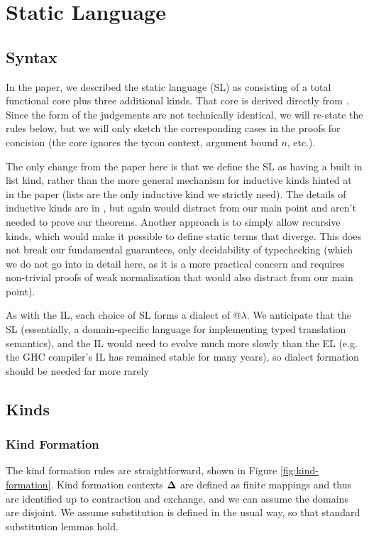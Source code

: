 \documentclass[12pt]{article}
\begin{document}
\section{Static Language}
\subsection{Syntax}

In the paper, we described the static language (SL) as consisting of a total functional core plus three additional kinds. That core is derived directly from \cite{pfpl}. Since the form of the judgements are not technically identical, we will re-state the rules below, but we will only sketch the corresponding cases in the proofs for concision (the core ignores the tycon context, argument bound $n$, etc.). 

The only change from the paper here is that we define the SL as having a built in list kind, rather than the more general mechanism for inductive kinds hinted at in the paper (lists are the only inductive kind we strictly need). The details of inductive kinds are in \cite{pfpl}, but again would distract from our main point and aren't needed to prove our theorems. Another approach is to simply allow recursive kinds, which would make it possible to define static terms that diverge. This does not break our fundamental guarantees, only decidability of typechecking (which we do not go into in detail here, as it is a more practical concern and requires non-trivial proofs of weak normalization that would also distract from our main point). 

As with the IL, each choice of SL forms a dialect of @$\lambda$. We anticipate that the SL (essentially, a domain-specific language for implementing typed translation semantics), and the IL would need to evolve much more slowly than the EL (e.g. the GHC compiler's IL has remained  stable for many years), so dialect formation should be needed far more rarely %

\subsection{Kinds}\label{sec:kinds}
\subsubsection{Kind Formation}

The kind formation rules are straightforward, shown in Figure \ref{fig:kind-formation}. Kind formation contexts $\boldsymbol\Delta$ are defined as finite mappings and thus are identified up to contraction and exchange, and we can assume the domains are disjoint. We assume substitution is defined in the usual way, so that standard substitution lemmas hold. 
\end{document}
